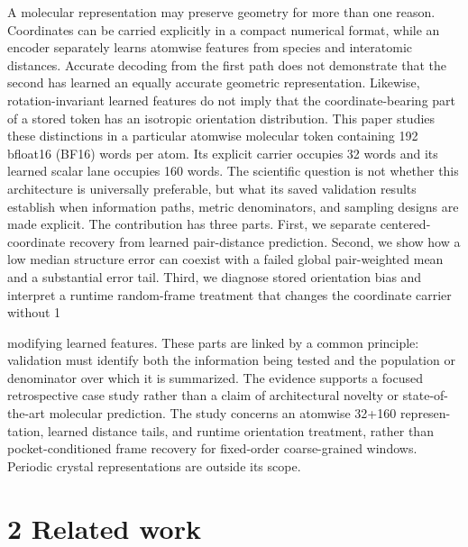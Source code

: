 \documentclass[11pt]{article}
\begin{document}
A molecular representation may preserve geometry for more than one reason. Coordinates can
be carried explicitly in a compact numerical format, while an encoder separately learns atomwise
features from species and interatomic distances. Accurate decoding from the first path does not
demonstrate that the second has learned an equally accurate geometric representation. Likewise,
rotation-invariant learned features do not imply that the coordinate-bearing part of a stored token
has an isotropic orientation distribution.
This paper studies these distinctions in a particular atomwise molecular token containing 192
bfloat16 (BF16) words per atom. Its explicit carrier occupies 32 words and its learned scalar lane
occupies 160 words. The scientific question is not whether this architecture is universally preferable,
but what its saved validation results establish when information paths, metric denominators, and
sampling designs are made explicit.
The contribution has three parts. First, we separate centered-coordinate recovery from learned
pair-distance prediction. Second, we show how a low median structure error can coexist with a
failed global pair-weighted mean and a substantial error tail. Third, we diagnose stored orientation
bias and interpret a runtime random-frame treatment that changes the coordinate carrier without
1

modifying learned features. These parts are linked by a common principle: validation must identify
both the information being tested and the population or denominator over which it is summarized.
The evidence supports a focused retrospective case study rather than a claim of architectural
novelty or state-of-the-art molecular prediction. The study concerns an atomwise 32+160 represen-
tation, learned distance tails, and runtime orientation treatment, rather than pocket-conditioned
frame recovery for fixed-order coarse-grained windows. Periodic crystal representations are outside
its scope.

\section*{2 Related work}
\end{document}
